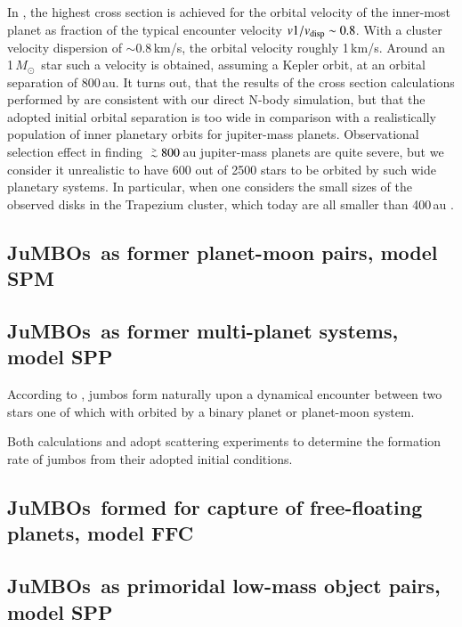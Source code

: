 \documentclass[aa]{lib/aa}
\newcommand{\MSun}{\mbox{${M}_\odot$}}
\def\apgt{\ {\raise-.5ex\hbox{$\buildrel>\over\sim$}}\ }
\newcommand{\jumbos}{\mbox{JuMBOs}}
\begin{document}
In \citep{2023arXiv231006016W}, the highest cross section is achieved
for the orbital velocity of the inner-most planet as fraction of the
typical encounter velocity $v1/v_{\rm disp} \sim 0.8$. With a cluster
velocity dispersion of $\sim 0.8$\,km/s, the orbital velocity roughly
1\,km/s. Around an 1\,\MSun\, star such a velocity is obtained,
assuming a Kepler orbit, at an orbital separation of 800\,au. It turns
out, that the results of the cross section calculations performed by
\citep{2023arXiv231006016W} are consistent with our direct N-body
simulation, but that the adopted initial orbital separation is too
wide in comparison with a realistically population of inner planetary
orbits for jupiter-mass planets.  Observational selection effect in
finding $\apgt 800$\,au jupiter-mass planets are quite severe, but we
consider it unrealistic to have 600 out of 2500 stars to be orbited by
such wide planetary systems. In particular, when one considers the
small sizes of the observed disks in the Trapezium cluster, which
today are all smaller than 400\,au \citep{2005A&A...441..195V}.

\subsection{\jumbos\, as former planet-moon pairs, model {\cal SPM}}


\subsection{\jumbos\, as former multi-planet systems, model {\cal SPP}}

According to \citep{2023arXiv231015603C}, jumbos form naturally upon a
dynamical encounter between two stars one of which with orbited by a
binary planet or planet-moon system.

Both calculations \citep{2023arXiv231006016W} and
\citep{2023arXiv231015603C} adopt scattering experiments to determine
the formation rate of jumbos from their adopted initial conditions.

\subsection{\jumbos\, formed for capture of free-floating planets, model {\cal FFC}}

\subsection{\jumbos\, as primoridal low-mass object pairs, model {\cal SPP}}
\end{document}
